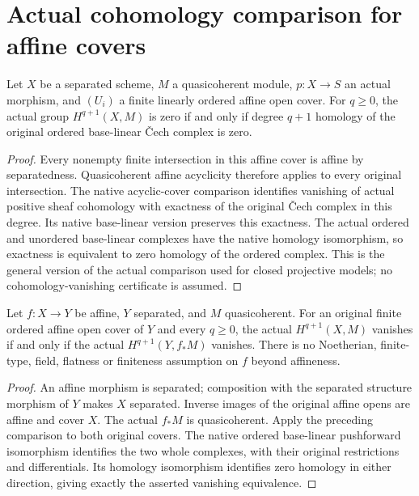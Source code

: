 \section{Actual cohomology comparison for affine covers}

\begin{lemma}
\label{lem:affine-pushforward-ordered-vanishing}
\leanok
Let $X$ be a separated scheme, $M$ a quasicoherent module, $p:X\to S$
an actual morphism, and $(U_i)$ a finite linearly ordered affine open
cover. For $q\ge0$, the actual group $H^{q+1}(X,M)$ is zero if and
only if degree $q+1$ homology of the original ordered base-linear
\v Cech complex is zero.
\end{lemma}
\begin{proof}
Every nonempty finite intersection in this affine cover is affine by
separatedness. Quasicoherent affine acyclicity therefore applies to
every original intersection. The native acyclic-cover comparison
identifies vanishing of actual positive sheaf cohomology with
exactness of the original \v Cech complex in this degree. Its native
base-linear version preserves this exactness. The actual ordered and
unordered base-linear complexes have the native homology isomorphism,
so exactness is equivalent to zero homology of the ordered complex.
This is the general version of the actual comparison used for closed
projective models; no cohomology-vanishing certificate is assumed.
\end{proof}

\begin{theorem}
\label{thm:affine-pushforward-cohomology-vanishing}
\leanok
Let $f:X\to Y$ be affine, $Y$ separated, and $M$ quasicoherent.
For an original finite ordered affine open cover of $Y$ and every
$q\ge0$, the actual $H^{q+1}(X,M)$ vanishes if and only if the actual
$H^{q+1}(Y,f_*M)$ vanishes. There is no Noetherian, finite-type,
field, flatness or finiteness assumption on $f$ beyond affineness.
\end{theorem}
\begin{proof}
An affine morphism is separated; composition with the separated
structure morphism of $Y$ makes $X$ separated. Inverse images of the
original affine opens are affine and cover $X$. The actual $f_*M$
is quasicoherent. Apply the preceding comparison to both original
covers. The native ordered base-linear pushforward isomorphism
identifies the two whole complexes, with their original restrictions
and differentials. Its homology isomorphism identifies zero homology
in either direction, giving exactly the asserted vanishing equivalence.
\end{proof}

